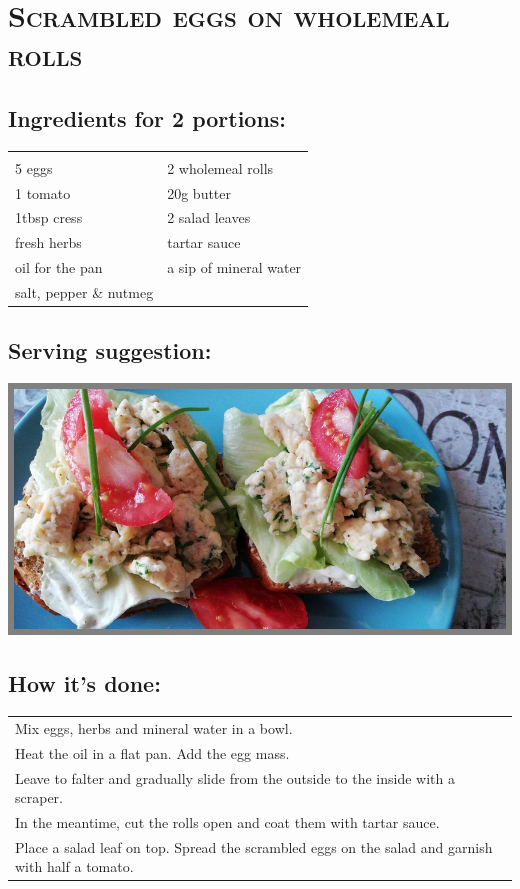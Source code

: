 \section{\textsc{Scrambled eggs on wholemeal rolls}}

\subsection*{Ingredients for 2 portions:}

\begin{tabular}{p{7.5cm} p{7.5cm}}
	& \\
	5 eggs & 2 wholemeal rolls \\
	1 tomato & 20g butter \\
  1tbsp cress & 2 salad leaves \\
  fresh herbs & tartar sauce \\
  oil for the pan & a sip of mineral water \\
  salt, pepper \& nutmeg
\end{tabular}

\subsection*{Serving suggestion:}

\includegraphics[width=\textwidth]{img/ruehrei_vollkorn.jpeg} \cite{ruehreivollkorn}

\subsection*{How it's done:}

\begin{tabular}{p{15cm}}
	\\
  Mix eggs, herbs and mineral water in a bowl.\\
  Heat the oil in a flat pan. Add the egg mass.\\
  Leave to falter and gradually slide from the outside to the inside with a scraper.\\
  In the meantime, cut the rolls open and coat them with tartar sauce.\\
  Place a salad leaf on top. Spread the scrambled eggs on the salad and garnish with half a tomato.
\end{tabular}
